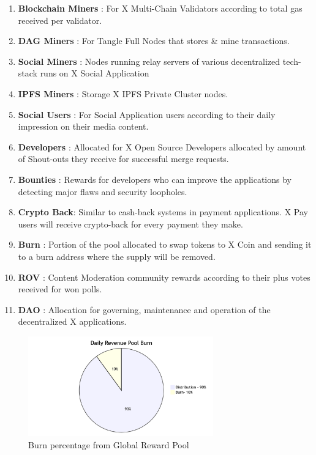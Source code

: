 \documentclass[letterpaper,11pt]{article}
\begin{document}
\begin{enumerate}[wide, labelwidth=!, labelindent=0pt]
\item \textbf{Blockchain Miners} : For X Multi-Chain Validators according to total gas received per validator.
\item \textbf{DAG Miners} : For Tangle Full Nodes that stores \& mine transactions.
\item \textbf{Social Miners} : Nodes running relay servers of various decentralized tech-stack runs on X Social Application
\item \textbf{IPFS Miners} : Storage X IPFS Private Cluster nodes.
\item \textbf{Social Users} : For Social Application users according to their daily impression on their media content.
\item \textbf{Developers} : Allocated for X Open Source Developers allocated by amount of Shout-outs they receive for successful merge requests.
\item \textbf{Bounties} : Rewards for developers who can improve the applications by detecting major flaws and security loopholes.
\item \textbf{Crypto Back}: Similar to cash-back systems in payment applications. X Pay users will receive crypto-back for every payment they make.
\item \textbf{Burn} : Portion of the pool allocated to swap tokens to X Coin and sending it to a burn address where the supply will be removed.
\item \textbf{ROV} : Content Moderation community rewards according to their plus votes received for won polls.
\item \textbf{DAO} : Allocation for governing, maintenance and operation of the decentralized X applications.
\end{enumerate} 

\begin{figure}[H]
\begin{center}
\includegraphics[width=8cm]{burn-chart}
\caption{Burn percentage from Global Reward Pool}
\end{center}
\end{figure}
\end{document}
